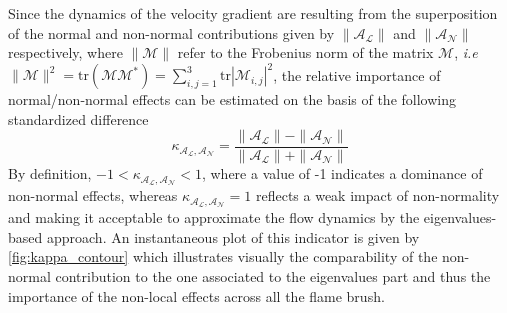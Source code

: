 \documentclass[review,times,sort&compress]{elsarticle}
\newcommand{\ie}{\emph{i.e~}}
\begin{document}
%
Since the dynamics of the velocity gradient are resulting from the superposition of the normal and 
non-normal contributions given by  $\|\mathcal{A}_{\mathcal{L}}\|$ and  $\|\mathcal{A}_{\mathcal{N}}\|$
respectively, where $\|\mathcal{M}\|$ refer to the Frobenius norm of the matrix $\mathcal{M}$, \ie
$\|\mathcal{M}\|^2 = \mathrm{tr}(\mathcal{M}\mathcal{M}^*)= \sum_{i, j=1}^3\mathrm{tr} |\mathcal{M}_{i,j}|^2$, the relative importance of normal/non-normal effects can be estimated on the basis of the following standardized difference
%
\begin{equation}
    \kappa_{\mathcal{A}_{\mathcal{L}}, \mathcal{A}_{\mathcal{N}}} = \frac{\|\mathcal{A}_{\mathcal{L}}\| -
    \|\mathcal{A}_{\mathcal{N}}\|}{\|\mathcal{A}_{\mathcal{L}}\|+\|\mathcal{A}_{\mathcal{N}}\|}
\end{equation}
%
By definition, $-1<\kappa_{\mathcal{A}_{\mathcal{L}}, \mathcal{A}_{\mathcal{N}}}<1$, where a value
of -1 indicates a dominance of non-normal effects, whereas $\kappa_{\mathcal{A}_{\mathcal{L}}, \mathcal{A}_{\mathcal{N}}}=1$ reflects a weak impact of non-normality and making it acceptable to approximate
the flow dynamics by the eigenvalues-based approach.
%
An instantaneous plot of this indicator is given by \autoref{fig:kappa_contour} which illustrates
visually the comparability of the non-normal contribution to the one associated to the eigenvalues 
part and thus the importance of the non-local effects across all the flame brush.%
%
\end{document}
